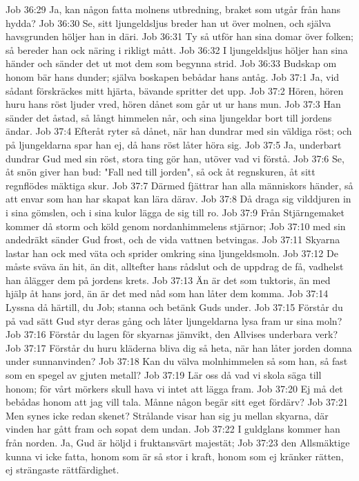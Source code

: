 Job 36:29  Ja, kan någon fatta molnens utbredning, braket som utgår från hans hydda?
Job 36:30  Se, sitt ljungeldsljus breder han ut över molnen, och själva havsgrunden höljer han in däri.
Job 36:31  Ty så utför han sina domar över folken; så bereder han ock näring i rikligt mått.
Job 36:32  I ljungeldsljus höljer han sina händer och sänder det ut mot dem som begynna strid.
Job 36:33  Budskap om honom bär hans dunder; själva boskapen bebådar hans antåg.
Job 37:1  Ja, vid sådant förskräckes mitt hjärta, bävande spritter det upp.
Job 37:2  Hören, hören huru hans röst ljuder vred, hören dånet som går ut ur hans mun.
Job 37:3  Han sänder det åstad, så långt himmelen når, och sina ljungeldar bort till jordens ändar.
Job 37:4  Efteråt ryter så dånet, när han dundrar med sin väldiga röst; och på ljungeldarna spar han ej, då hans röst låter höra sig.
Job 37:5  Ja, underbart dundrar Gud med sin röst, stora ting gör han, utöver vad vi förstå.
Job 37:6  Se, åt snön giver han bud: "Fall ned till jorden", så ock åt regnskuren, åt sitt regnflödes mäktiga skur.
Job 37:7  Därmed fjättrar han alla människors händer, så att envar som han har skapat kan lära därav.
Job 37:8  Då draga sig vilddjuren in i sina gömslen, och i sina kulor lägga de sig till ro.
Job 37:9  Från Stjärngemaket kommer då storm och köld genom nordanhimmelens stjärnor;
Job 37:10  med sin andedräkt sänder Gud frost, och de vida vattnen betvingas.
Job 37:11  Skyarna lastar han ock med väta och sprider omkring sina ljungeldsmoln.
Job 37:12  De måste sväva än hit, än dit, alltefter hans rådslut och de uppdrag de få, vadhelst han ålägger dem på jordens krets.
Job 37:13  Än är det som tuktoris, än med hjälp åt hans jord, än är det med nåd som han låter dem komma.
Job 37:14  Lyssna då härtill, du Job; stanna och betänk Guds under.
Job 37:15  Förstår du på vad sätt Gud styr deras gång och låter ljungeldarna lysa fram ur sina moln?
Job 37:16  Förstår du lagen för skyarnas jämvikt, den Allvises underbara verk?
Job 37:17  Förstår du huru kläderna bliva dig så heta, när han låter jorden domna under sunnanvinden?
Job 37:18  Kan du välva molnhimmelen så som han, så fast som en spegel av gjuten metall?
Job 37:19  Lär oss då vad vi skola säga till honom; för vårt mörkers skull hava vi intet att lägga fram.
Job 37:20  Ej må det bebådas honom att jag vill tala. Månne någon begär sitt eget fördärv?
Job 37:21  Men synes icke redan skenet? Strålande visar han sig ju mellan skyarna, där vinden har gått fram och sopat dem undan.
Job 37:22  I guldglans kommer han från norden. Ja, Gud är höljd i fruktansvärt majestät;
Job 37:23  den Allsmäktige kunna vi icke fatta, honom som är så stor i kraft, honom som ej kränker rätten, ej strängaste rättfärdighet.
